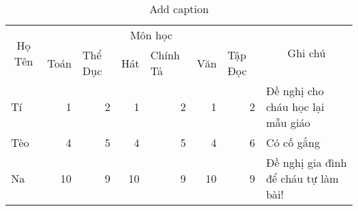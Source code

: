 \documentclass[a4paper]{article}
\begin{document}
  \begin{table}[htbp]
    \centering
    \caption{Add caption}
      \begin{tabular}{|l|rrrrrr|l|}
      \toprule
      \multicolumn{1}{|c|}{\multirow{2}[4]{*}{Họ Tên}} & \multicolumn{6}{c|}{Môn học}                  & \multicolumn{1}{c|}{\multirow{2}[4]{*}{Ghi chú}} \\
  \cmidrule{2-7}          & \multicolumn{1}{l}{Toán} & \multicolumn{1}{l}{Thể Dục} & \multicolumn{1}{l}{Hát} & \multicolumn{1}{l}{Chính Tả} & \multicolumn{1}{l}{Văn} & \multicolumn{1}{l|}{Tập Đọc} &  \\
      \midrule
      Tí    & 1     & 2     & 1     & 2     & 1     & 2     & Đề nghị cho cháu học lại mẫu giáo \\
      Tèo   & 4     & 5     & 4     & 5     & 4     & 6     & Có cố gắng \\
      Na    & 10    & 9     & 10    & 9     & 10    & 9     & Đề nghị gia đình để cháu tự làm bài! \\
      \bottomrule
      \end{tabular}%
    \label{tab:addlabel}%
  \end{table}%
\end{document}
